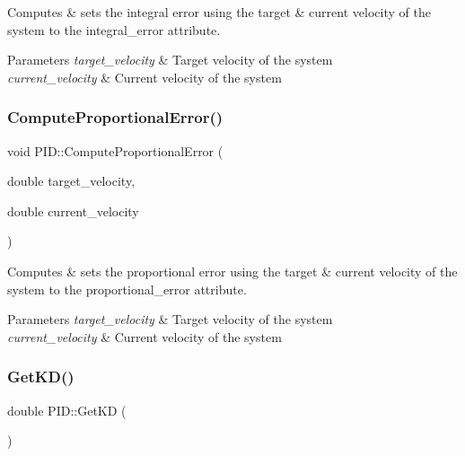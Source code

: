Computes \& sets the integral error using the target \& current velocity of the system to the integral\+\_\+error attribute. 


\begin{DoxyParams}{Parameters}
{\em target\+\_\+velocity} & Target velocity of the system \\
\hline
{\em current\+\_\+velocity} & Current velocity of the system \\
\hline
\end{DoxyParams}
\mbox{\label{classPID_a59aa8f314e7dad1db04cad16af197935}} 
\subsubsection{\texorpdfstring{Compute\+Proportional\+Error()}{ComputeProportionalError()}}
{\footnotesize\ttfamily void P\+I\+D\+::\+Compute\+Proportional\+Error (\begin{DoxyParamCaption}\item[{double}]{target\+\_\+velocity,  }\item[{double}]{current\+\_\+velocity }\end{DoxyParamCaption})\hspace{0.3cm}{\ttfamily [private]}}



Computes \& sets the proportional error using the target \& current velocity of the system to the proportional\+\_\+error attribute. 


\begin{DoxyParams}{Parameters}
{\em target\+\_\+velocity} & Target velocity of the system \\
\hline
{\em current\+\_\+velocity} & Current velocity of the system \\
\hline
\end{DoxyParams}
\mbox{\label{classPID_ab36efdea8287d9389fa9ef83b35569b2}} 
\subsubsection{\texorpdfstring{Get\+K\+D()}{GetKD()}}
{\footnotesize\ttfamily double P\+I\+D\+::\+Get\+KD (\begin{DoxyParamCaption}{ }\end{DoxyParamCaption})}



